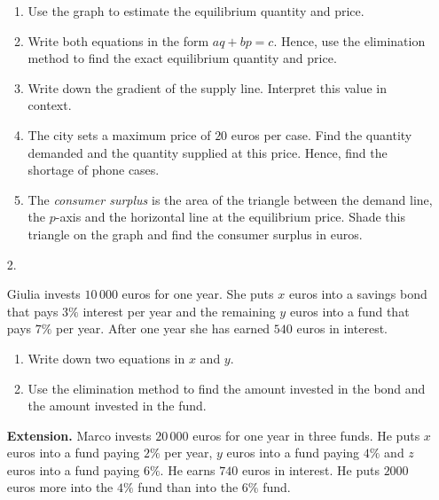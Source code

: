 \documentclass[12pt, twoside]{article}
\begin{document}
\begin{enumerate}[itemsep=0.15cm]
\begin{enumerate}[itemsep=0.1cm]
  \item Use the graph to estimate the equilibrium quantity and price.
  \item Write both equations in the form $aq + bp = c$. Hence, use the
  elimination method to find the exact equilibrium quantity and price.
  \item Write down the gradient of the supply line. Interpret this value
  in context.
  \item The city sets a maximum price of $20$ euros per case. Find the
  quantity demanded and the quantity supplied at this price. Hence, find
  the shortage of phone cases.
  \item The \emph{consumer surplus} is the area of the triangle between the
  demand line, the $p$-axis and the horizontal line at the equilibrium
  price. Shade this triangle on the graph and find the consumer surplus
  in euros.
\end{enumerate}


\newpage

\item[2.]

Giulia invests $10\,000$ euros for one year. She puts $x$ euros into a
savings bond that pays $3\%$ interest per year and the remaining $y$ euros
into a fund that pays $7\%$ per year. After one year she has earned $540$
euros in interest.

\begin{enumerate}[itemsep=0.1cm]
  \item Write down two equations in $x$ and $y$.
  \item Use the elimination method to find the amount invested in the
  bond and the amount invested in the fund.
\end{enumerate}

\textbf{Extension.} Marco invests $20\,000$ euros for one year in three
funds. He puts $x$ euros into a fund paying $2\%$ per year, $y$ euros
into a fund paying $4\%$ and $z$ euros into a fund paying $6\%$. He earns
$740$ euros in interest. He puts $2000$ euros more into the $4\%$ fund
than into the $6\%$ fund.


\end{enumerate}
\end{document}
